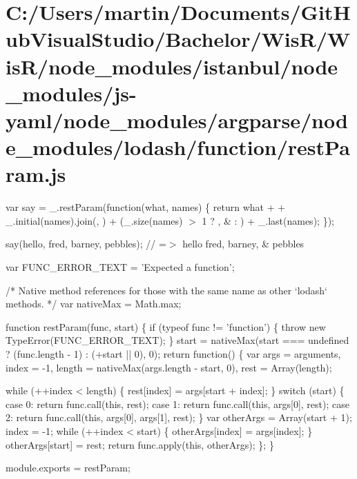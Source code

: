 \hypertarget{_c_1_2_users_2martin_2_documents_2_git_hub_visual_studio_2_bachelor_2_wis_r_2_wis_r_2node_module4648d27b59b2f4698324fc240228d9d0}{}\section{C\+:/\+Users/martin/\+Documents/\+Git\+Hub\+Visual\+Studio/\+Bachelor/\+Wis\+R/\+Wis\+R/node\+\_\+modules/istanbul/node\+\_\+modules/js-\/yaml/node\+\_\+modules/argparse/node\+\_\+modules/lodash/function/rest\+Param.\+js}
var say = \+\_\+.\+rest\+Param(function(what, names) \{ return what + \textquotesingle{} \textquotesingle{} + \+\_\+.\+initial(names).join(\textquotesingle{}, \textquotesingle{}) + (\+\_\+.\+size(names) $>$ 1 ? \textquotesingle{}, \& \textquotesingle{} \+: \textquotesingle{}\textquotesingle{}) + \+\_\+.\+last(names); \});

say(\textquotesingle{}hello\textquotesingle{}, \textquotesingle{}fred\textquotesingle{}, \textquotesingle{}barney\textquotesingle{}, \textquotesingle{}pebbles\textquotesingle{}); // =$>$ \textquotesingle{}hello fred, barney, \& pebbles\textquotesingle{}


\begin{DoxyCodeInclude}

var FUNC\_ERROR\_TEXT = \textcolor{stringliteral}{'Expected a function'};

\textcolor{comment}{/* Native method references for those with the same name as other `lodash` methods. */}
var nativeMax = Math.max;

\textcolor{keyword}{function} restParam(func, start) \{
  \textcolor{keywordflow}{if} (typeof func != \textcolor{stringliteral}{'function'}) \{
    \textcolor{keywordflow}{throw} \textcolor{keyword}{new} TypeError(FUNC\_ERROR\_TEXT);
  \}
  start = nativeMax(start === undefined ? (func.length - 1) : (+start || 0), 0);
  \textcolor{keywordflow}{return} \textcolor{keyword}{function}() \{
    var args = arguments,
        index = -1,
        length = nativeMax(args.length - start, 0),
        rest = Array(length);

    \textcolor{keywordflow}{while} (++index < length) \{
      rest[index] = args[start + index];
    \}
    \textcolor{keywordflow}{switch} (start) \{
      \textcolor{keywordflow}{case} 0: \textcolor{keywordflow}{return} func.call(\textcolor{keyword}{this}, rest);
      \textcolor{keywordflow}{case} 1: \textcolor{keywordflow}{return} func.call(\textcolor{keyword}{this}, args[0], rest);
      \textcolor{keywordflow}{case} 2: \textcolor{keywordflow}{return} func.call(\textcolor{keyword}{this}, args[0], args[1], rest);
    \}
    var otherArgs = Array(start + 1);
    index = -1;
    \textcolor{keywordflow}{while} (++index < start) \{
      otherArgs[index] = args[index];
    \}
    otherArgs[start] = rest;
    \textcolor{keywordflow}{return} func.apply(\textcolor{keyword}{this}, otherArgs);
  \};
\}

module.exports = restParam;
\end{DoxyCodeInclude}
 